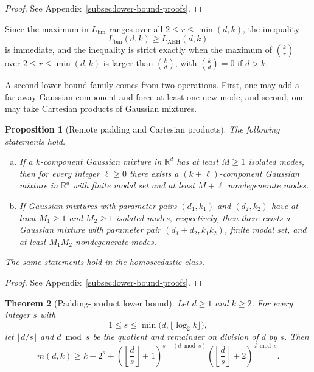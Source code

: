 \documentclass[11pt]{article}
\theoremstyle{plain}
\newtheorem{theorem}{Theorem}[section]
\newtheorem{proposition}[theorem]{Proposition}
\theoremstyle{definition}
\theoremstyle{remark}
\numberwithin{equation}{section}
\newcommand{\R}{\mathbb{R}}
\begin{document}
\begin{proof}
See Appendix~\ref{subsec:lower-bound-proofs}.
\end{proof}

Since the maximum in $L_{\mathrm{bin}}$ ranges over all $2\le r\le \min(d,k)$, the inequality
\[
L_{\mathrm{bin}}(d,k)\ge L_{\mathrm{AEH}}(d,k)
\]
is immediate, and the inequality is strict exactly when the maximum of $\binom{k}{r}$ over $2\le r\le \min(d,k)$ is larger than $\binom{k}{d}$, with $\binom{k}{d}=0$ if $d>k$.

A second lower-bound family comes from two operations. First, one may add a far-away Gaussian component and force at least one new mode, and second, one may take Cartesian products of Gaussian mixtures.

\begin{proposition}[Remote padding and Cartesian products]\label{prop:padding-products}
The following statements hold.
\begin{enumerate}[(a)]
    \item If a $k$-component Gaussian mixture in $\R^d$ has at least $M\ge1$ isolated modes, then for every integer $\ell\ge 0$ there exists a $(k+\ell)$-component Gaussian mixture in $\R^d$ with finite modal set and at least $M+\ell$ nondegenerate modes.
    \item If Gaussian mixtures with parameter pairs $(d_1,k_1)$ and $(d_2,k_2)$ have at least $M_1\ge1$ and $M_2\ge1$ isolated modes, respectively, then there exists a Gaussian mixture with parameter pair $(d_1+d_2,k_1k_2)$, finite modal set, and at least $M_1M_2$ nondegenerate modes.
\end{enumerate}
The same statements hold in the homoscedastic class.
\end{proposition}

\begin{proof}
See Appendix~\ref{subsec:lower-bound-proofs}.
\end{proof}

\begin{theorem}[Padding-product lower bound]\label{thm:padding-product-lower}
Let $d\ge 1$ and $k\ge 2$. For every integer $s$ with
\[
1\le s\le \min\bigl(d,\lfloor \log_2 k\rfloor\bigr),
\]
let $\lfloor d/s\rfloor$ and $d\bmod s$ be the quotient and remainder on division of $d$ by $s$. Then
\[
m(d,k)\ge k-2^s+\left(\left\lfloor\frac{d}{s}\right\rfloor+1\right)^{s-(d\bmod s)}\left(\left\lfloor\frac{d}{s}\right\rfloor+2\right)^{d\bmod s}.
\]
\end{theorem}
\end{document}

